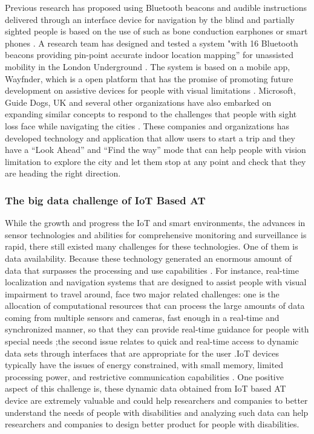 Previous research has proposed using Bluetooth beacons and audible 
instructions delivered through an interface device for navigation 
by the blind and partially sighted people is based on the use of 
such as bone conduction earphones or smart phones \cite{Barbeau,Shah}. 
A research team has designed and tested a system "with 16 Bluetooth beacons 
providing pin-point accurate indoor location mapping” 
for unassisted mobility in the London Underground \cite{Shah}. The system is based on a mobile app, Wayfnder,  which is 
a open platform that has the promise of promoting future 
development on assistive devices for people with visual limitations \cite{Shah}. 
Microsoft, Guide Dogs, UK and several other organizations have also embarked
on expanding similar concepts to respond to the challenges that people with sight
loss face while navigating the cities \cite{Shah}.  These companies and organizations
has developed technology and application that allow users to start a trip and they 
have a ``Look Ahead'' and ``Find the way'' mode that can help people with vision
limitation to explore the city and let them stop at any point and check 
that they are heading the right direction. 

\subsubsection{The big data challenge of IoT Based AT}
While the growth and progress the IoT and smart
environments, the advances in sensor technologies and abilities for comprehensive
monitoring and surveillance is rapid, there still existed many challenges for these 
technologies. One of them is data availability. Because these technology generated an
enormous amount of data that surpasses the processing and use capabilities \cite{Shah}. For
instance, real-time localization and navigation systems that are designed to assist people 
with visual impairment to travel around, face two major related challenges: one is 
the allocation of computational resources that can process the large
amounts of data coming from multiple sensors and cameras, fast enough in a real-time
and synchronized manner, so that they can provide real-time guidance for people 
with special needs \cite{Shah};the second issue relates to quick and real-time access to
dynamic data sets through interfaces that are appropriate for the user \cite{Shah}.IoT devices 
typically have the issues of energy constrained, with small memory, limited processing 
power, and restrictive communication capabilities \cite{Shah}. One positive aspect of this 
challenge is, these dynamic data obtained from IoT based AT device are extremely 
valuable and could help researchers and companies to better understand the 
needs of people with disabilities and analyzing such data can help researchers 
and companies to design better product for people with disabilities.

